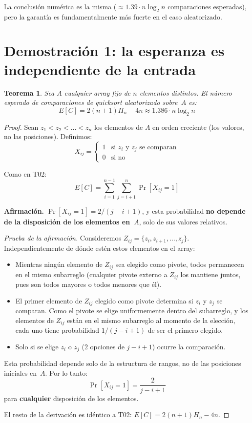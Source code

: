 \documentclass[11pt, letterpaper]{article}
\theoremstyle{definition}
\theoremstyle{plain}
\newtheorem{theorem}{Teorema}[section]
\theoremstyle{remark}
\begin{document}
La conclusión numérica es la misma ($\approx 1.39 \cdot n\log_2 n$
comparaciones esperadas), pero la garantía es fundamentalmente más
fuerte en el caso aleatorizado.

\section{Demostración 1: la esperanza es independiente de la entrada}

\begin{theorem}\label{thm:independent}
Sea $A$ cualquier array fijo de $n$ elementos distintos. El número
esperado de comparaciones de quicksort aleatorizado sobre~$A$ es:
\[
  E[C] = 2(n+1)H_n - 4n \approx 1.386 \cdot n \log_2 n
\]
\end{theorem}

\begin{proof}
Sean $z_1 < z_2 < \ldots < z_n$ los elementos de $A$ en orden
creciente (los valores, no las posiciones). Definimos:
\[
  X_{ij} = \begin{cases}
    1 & \text{si } z_i \text{ y } z_j \text{ se comparan} \\
    0 & \text{si no}
  \end{cases}
\]

Como en T02:
\[
  E[C] = \sum_{i=1}^{n-1}\sum_{j=i+1}^{n} \Pr[X_{ij} = 1]
\]

\textbf{Afirmación.} $\Pr[X_{ij} = 1] = 2/(j - i + 1)$, y esta
probabilidad \textbf{no depende de la disposición de los elementos
en~$A$}, solo de sus valores relativos.

\emph{Prueba de la afirmación.} Consideremos
$Z_{ij} = \{z_i, z_{i+1}, \ldots, z_j\}$. Independientemente de
dónde estén estos elementos en el array:
\begin{itemize}
  \item Mientras ningún elemento de $Z_{ij}$ sea elegido como pivote,
    todos permanecen en el mismo subarreglo (cualquier pivote externo
    a $Z_{ij}$ los mantiene juntos, pues son todos mayores o todos
    menores que él).
  \item El primer elemento de $Z_{ij}$ elegido como pivote determina
    si $z_i$ y $z_j$ se comparan. Como el pivote se elige
    uniformemente dentro del subarreglo, y los elementos de $Z_{ij}$
    están en el mismo subarreglo al momento de la elección, cada uno
    tiene probabilidad $1/(j{-}i{+}1)$ de ser el primero elegido.
  \item Solo si se elige $z_i$ o $z_j$ (2 opciones de $j{-}i{+}1$)
    ocurre la comparación.
\end{itemize}

Esta probabilidad depende solo de la estructura de rangos, no de las
posiciones iniciales en~$A$. Por lo tanto:
\[
  \Pr[X_{ij} = 1] = \frac{2}{j-i+1}
\]
para \textbf{cualquier} disposición de los elementos.

El resto de la derivación es idéntico a T02:
$E[C] = 2(n+1)H_n - 4n$.
\end{proof}
\end{document}
